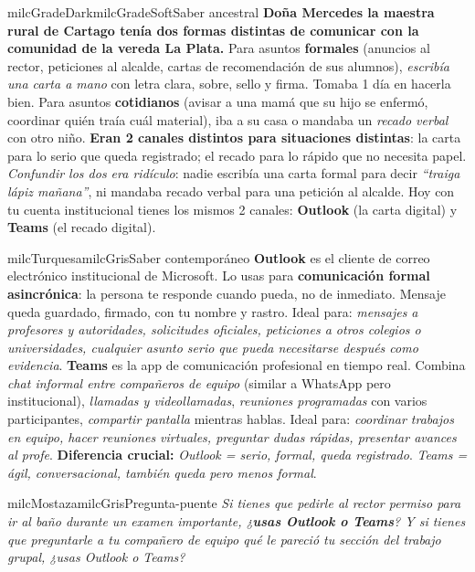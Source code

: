 \documentclass[11pt,letterpaper]{article}
\begin{document}
\begin{softbox}{milcGradeDark}{milcGradeSoft}{Saber ancestral}
\textbf{Doña Mercedes la maestra rural de Cartago tenía dos formas distintas de comunicar con la comunidad de la vereda La Plata.} Para asuntos \textbf{formales} (anuncios al rector, peticiones al alcalde, cartas de recomendación de sus alumnos), \emph{escribía una carta a mano} con letra clara, sobre, sello y firma. Tomaba 1 día en hacerla bien. Para asuntos \textbf{cotidianos} (avisar a una mamá que su hijo se enfermó, coordinar quién traía cuál material), iba a su casa o mandaba un \emph{recado verbal} con otro niño. \textbf{Eran 2 canales distintos para situaciones distintas}: la carta para lo serio que queda registrado; el recado para lo rápido que no necesita papel. \emph{Confundir los dos era ridículo}: nadie escribía una carta formal para decir \emph{``traiga lápiz mañana''}, ni mandaba recado verbal para una petición al alcalde. Hoy con tu cuenta institucional tienes los mismos 2 canales: \textbf{Outlook} (la carta digital) y \textbf{Teams} (el recado digital).
\end{softbox}

\begin{softbox}{milcTurquesa}{milcGris}{Saber contemporáneo}
\textbf{Outlook} es el cliente de correo electrónico institucional de Microsoft. Lo usas para \textbf{comunicación formal asincrónica}: la persona te responde cuando pueda, no de inmediato. Mensaje queda guardado, firmado, con tu nombre y rastro. Ideal para: \emph{mensajes a profesores y autoridades, solicitudes oficiales, peticiones a otros colegios o universidades, cualquier asunto serio que pueda necesitarse después como evidencia}. \textbf{Teams} es la app de comunicación profesional en tiempo real. Combina \emph{chat informal entre compañeros de equipo} (similar a WhatsApp pero institucional), \emph{llamadas y videollamadas}, \emph{reuniones programadas} con varios participantes, \emph{compartir pantalla} mientras hablas. Ideal para: \emph{coordinar trabajos en equipo, hacer reuniones virtuales, preguntar dudas rápidas, presentar avances al profe}. \textbf{Diferencia crucial:} \emph{Outlook = serio, formal, queda registrado}. \emph{Teams = ágil, conversacional, también queda pero menos formal}.
\end{softbox}

\begin{softbox}{milcMostaza}{milcGris}{Pregunta-puente}
\textit{Si tienes que \emph{pedirle al rector permiso para ir al baño durante un examen importante}, ¿\textbf{usas Outlook o Teams}? Y si tienes que \emph{preguntarle a tu compañero de equipo qué le pareció tu sección del trabajo grupal}, ¿usas Outlook o Teams?}
\end{softbox}
\end{document}

